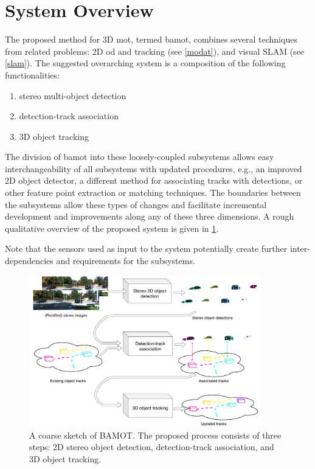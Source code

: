 \documentclass[headsepline, hidelinks, footsepline, footinclude=false, oneside, fontsize=11pt, paper=a4, listof=totoc, bibliography=totoc]{scrbook}
\begin{document}
\section{System Overview}
\label{sec:org13b094a}
   The proposed method for 3D \gls{mot}, termed \gls{bamot}, combines several techniques from related problems: 2D \gls{od} and tracking (see \cref{modat}), and visual SLAM (see \cref{slam}).
The suggested overarching system is a composition of the following functionalities:

\begin{samepage}
\begin{enumerate}
\item stereo multi-object detection
\item detection-track association
\item 3D object tracking
\end{enumerate}
\end{samepage}

The division of \gls{bamot} into these loosely-coupled subsystems allows easy interchangeability of all subsystems with updated procedures, e.g., an improved 2D object detector, a different method for associating tracks with detections, 
or other feature point extraction or matching techniques. The boundaries between the subsystems allow these types of changes and facilitate incremental development and improvements along any of these
three dimensions. A rough qualitative overview of the proposed system is given in \cref{fig:system-overview}.

Note that the sensors used as input to the system potentially create further inter-dependencies and requirements for the subsystems.

\begin{figure}[htbp]
\centering
\includegraphics[width=0.9\textwidth]{figures/system-overview.pdf}
\caption{\label{fig:system-overview}A coarse sketch of BAMOT. The proposed process consists of three steps: 2D stereo object detection, detection-track association, and 3D object tracking.}
\end{figure}
\end{document}

